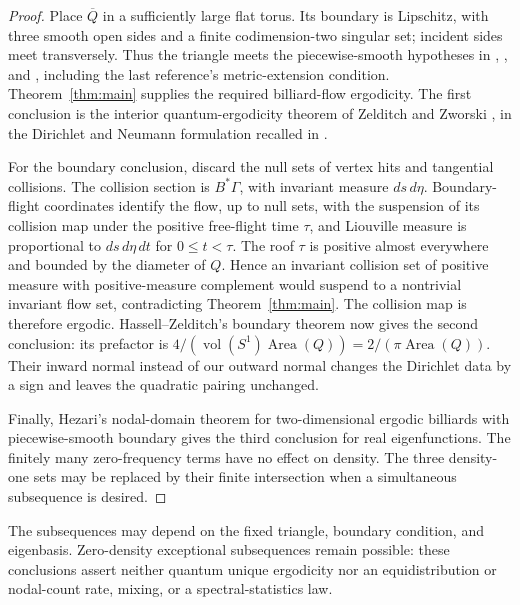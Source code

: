 \documentclass[11pt]{article}
\theoremstyle{remark}
\begin{document}
\begin{proof}
Place \(\overline Q\) in a sufficiently large flat torus. Its boundary
is Lipschitz, with three smooth open sides and a finite codimension-two
singular set; incident sides meet transversely. Thus the triangle meets
the piecewise-smooth hypotheses in \cite[Section~2]{Burq},
\cite[Definition~3.1]{HZ}, and \cite[Definition~1.16]{Hezari}, including
the last reference's metric-extension condition.
Theorem~\ref{thm:main} supplies the required billiard-flow ergodicity.
The first conclusion is the interior quantum-ergodicity theorem of
Zelditch and Zworski \cite{ZZ}, in the Dirichlet and Neumann formulation
recalled in \cite[Theorem~2 and Remark~2.1]{Burq}.

For the boundary conclusion, discard the null sets of vertex hits and
tangential collisions. The collision section is \(B^*\Gamma\), with
invariant measure \(ds\,d\eta\). Boundary-flight coordinates identify
the flow, up to null sets, with the suspension of its collision map
under the positive free-flight time \(\tau\), and Liouville measure is
proportional to \(ds\,d\eta\,dt\) for \(0\le t<\tau\).
The roof \(\tau\) is positive almost everywhere and bounded by the
diameter of \(Q\). Hence an invariant collision set of positive measure
with positive-measure complement would suspend to a nontrivial invariant
flow set, contradicting Theorem~\ref{thm:main}. The collision map is
therefore ergodic. Hassell--Zelditch's boundary theorem
\cite[Theorem~1.1, equations~(1.3)--(1.5), and Section~7]{HZ} now gives the second
conclusion: its prefactor is
\(4/(\operatorname{vol}(S^1)\operatorname{Area}(Q))
=2/(\pi\operatorname{Area}(Q))\).
Their inward normal instead of our outward normal changes the Dirichlet
data by a sign and leaves the quadratic pairing unchanged.

Finally, Hezari's nodal-domain theorem for two-dimensional ergodic
billiards with piecewise-smooth boundary
\cite[Theorem~1.6]{Hezari} gives the third conclusion for real
eigenfunctions. The finitely many zero-frequency terms have no effect on
density. The three density-one sets may be replaced by their finite
intersection when a simultaneous subsequence is desired.
\end{proof}

The subsequences may depend on the fixed triangle, boundary condition,
and eigenbasis. Zero-density exceptional subsequences remain possible:
these conclusions assert neither quantum unique ergodicity nor an
equidistribution or nodal-count rate, mixing, or a spectral-statistics
law.


\begingroup
\raggedright


\endgroup
\end{document}
